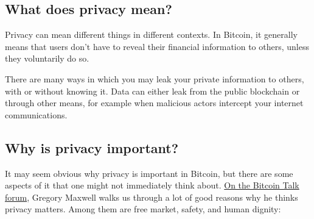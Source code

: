 \hypertarget{_what_does_privacy_mean}{%
\subsection{What does privacy mean?}\label{_what_does_privacy_mean}}

Privacy can mean different things in different contexts. In Bitcoin, it
generally means that users don't have to reveal their financial
information to others, unless they voluntarily do so.

There are many ways in which you may leak your private information to
others, with or without knowing it. Data can either leak from the public
blockchain or through other means, for example when malicious actors
intercept your internet communications.

\hypertarget{whyprivacyimportant}{%
\subsection{Why is privacy important?}\label{whyprivacyimportant}}

It may seem obvious why privacy is important in Bitcoin, but there are
some aspects of it that one might not immediately think about.
\href{https://bitcointalk.org/index.php?topic=334316.msg3588908\#msg3588908}{On
the Bitcoin Talk forum}, Gregory Maxwell walks us through a lot of good
reasons why he thinks privacy matters. Among them are free market,
safety, and human dignity:

